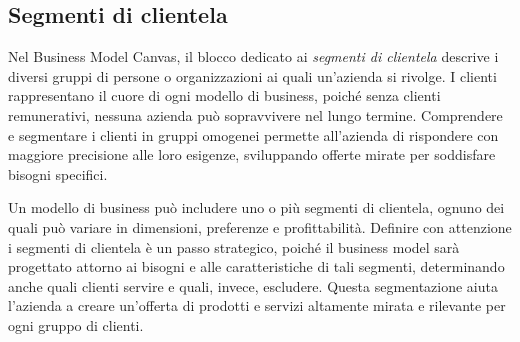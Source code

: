 \subsection*{Segmenti di clientela}
Nel Business Model Canvas, il blocco dedicato ai \textit{segmenti di clientela} descrive i diversi gruppi di persone o organizzazioni ai quali un'azienda si rivolge. I clienti rappresentano il cuore di ogni modello di business, poiché senza clienti remunerativi, nessuna azienda può sopravvivere nel lungo termine. Comprendere e segmentare i clienti in gruppi omogenei permette all'azienda di rispondere con maggiore precisione alle loro esigenze, sviluppando offerte mirate per soddisfare bisogni specifici.

Un modello di business può includere uno o più segmenti di clientela, ognuno dei quali può variare in dimensioni, preferenze e profittabilità. Definire con attenzione i segmenti di clientela è un passo strategico, poiché il business model sarà progettato attorno ai bisogni e alle caratteristiche di tali segmenti, determinando anche quali clienti servire e quali, invece, escludere. Questa segmentazione aiuta l’azienda a creare un’offerta di prodotti e servizi altamente mirata e rilevante per ogni gruppo di clienti.

